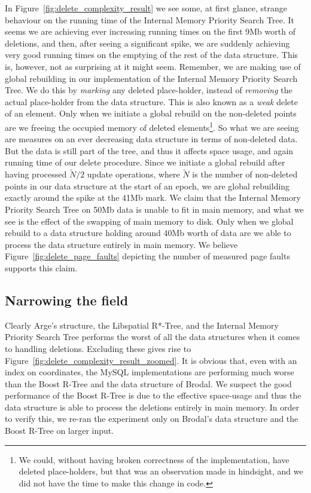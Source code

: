 \documentclass[twoside,11pt,openright]{report}
\def \bar {\widetilde}
\begin{document}
In Figure~\ref{fig:delete_complexity_result} we see some, at first glance, strange behaviour on the running time of the Internal Memory Priority Search Tree. It seems we are achieving ever increasing running times on the first 9Mb worth of deletions, and then, after seeing a significant spike, we are suddenly achieving very good running times on the emptying of the rest of the data structure. This is, however, not as surprising at it might seem. Remember, we are making use of global rebuilding in our implementation of the Internal Memory Priority Search Tree. We do this by \textit{marking} any deleted place-holder, instead of \textit{removing} the actual place-holder from the data structure. This is also known as a \textit{weak} delete of an element. Only when we initiate a global rebuild on the non-deleted points are we freeing the occupied memory of deleted elements\footnote{We could, without having broken correctness of the implementation, have deleted place-holders, but that was an observation made in hindsight, and we did not have the time to make this change in code.}. So what we are seeing are measures on an ever decreasing data structure in terms of non-deleted data. But the data is still part of the tree, and thus it affects space usage, and again running time of our delete procedure. Since we initiate a global rebuild after having processed $\bar{N} / 2$ update operations, where $\bar{N}$ is the number of non-deleted points in our data structure at the start of an epoch, we are global rebuilding exactly around the spike at the 41Mb mark. We claim that the Internal Memory Priority Search Tree on 50Mb data is unable to fit in main memory, and what we see is the effect of the swapping of main memory to disk. Only when we global rebuild to a data structure holding around 40Mb worth of data are we able to process the data structure entirely in main memory. We believe Figure~\ref{fig:delete_page_faults} depicting the number of measured page faults supports this claim.

\subsection*{Narrowing the field}

Clearly Arge's structure, the Libspatial R*-Tree, and the Internal Memory Priority Search Tree performs the worst of all the data structures when it comes to handling deletions. Excluding these gives rise to Figure~\ref{fig:delete_complexity_result_zoomed}. It is obvious that, even with an index on coordinates, the MySQL implementations are performing much worse than the Boost R-Tree and the data structure of Brodal. We suspect the good performance of the Boost R-Tree is due to the effective space-usage and thus the data structure is able to process the deletions entirely in main memory. In order to verify this, we re-ran the experiment only on Brodal's data structure and the Boost R-Tree on larger input.
\end{document}
